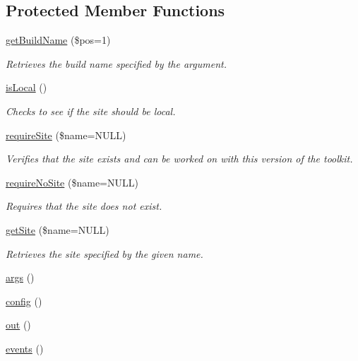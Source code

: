 \subsection*{Protected Member Functions}
\begin{DoxyCompactItemize}
\item 
\hyperlink{classGenericSiteCommand_a5562058d3e947b9d9306f473c64e6108}{get\-Build\-Name} (\$pos=1)
\begin{DoxyCompactList}\small\item\em Retrieves the build name specified by the argument. \end{DoxyCompactList}\item 
\hyperlink{classGenericSiteCommand_a5c0051d0cef1a895622617a706a34f9a}{is\-Local} ()
\begin{DoxyCompactList}\small\item\em Checks to see if the site should be local. \end{DoxyCompactList}\item 
\hyperlink{classGenericSiteCommand_afde72fc4f48280c3c60705977cdfdb78}{require\-Site} (\$name=N\-U\-L\-L)
\begin{DoxyCompactList}\small\item\em Verifies that the site exists and can be worked on with this version of the toolkit. \end{DoxyCompactList}\item 
\hyperlink{classGenericSiteCommand_a4fb8cea3d6d8e3fb81ab0f1d2852e606}{require\-No\-Site} (\$name=N\-U\-L\-L)
\begin{DoxyCompactList}\small\item\em Requires that the site does not exist. \end{DoxyCompactList}\item 
\hyperlink{classGenericSiteCommand_aab58878eb7b665d8c02b29d14856c5c6}{get\-Site} (\$name=N\-U\-L\-L)
\begin{DoxyCompactList}\small\item\em Retrieves the site specified by the given name. \end{DoxyCompactList}\item 
\hyperlink{classGenericCommand_a2b5ffbef597bcac2bb27fb9fe9ceb996}{args} ()
\item 
\hyperlink{classGenericCommand_a806e73ae27fe8187419963c1839531b4}{config} ()
\item 
\hyperlink{classGenericCommand_a08478bb9a4cce51c5eec24b4dab17cc8}{out} ()
\item 
\hyperlink{classGenericCommand_ac45bd478789164f7c5fc219ead8cf9d2}{events} ()

\end{DoxyCompactItemize}
